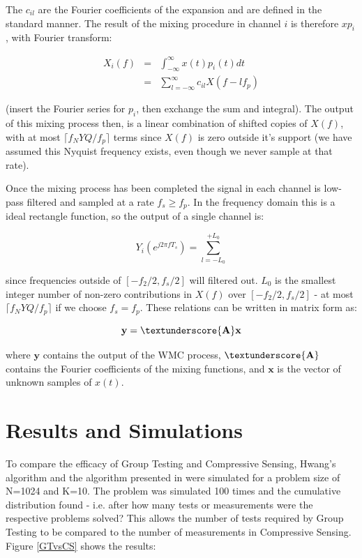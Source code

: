 \documentclass[conference]{IEEEtran}
\begin{document}
The \(c_{il}\) are the Fourier coefficients of the expansion and are defined in the standard manner. The result of the mixing procedure in channel \(i\) is therefore \(xp_i\), with Fourier transform:

\begin{align}
X_{i}\left(f\right) &=& \int_{-\infty}^{\infty} x\left(t\right) p_i\left(t\right) dt
\\ &=& \sum_{l=-\infty}^{\infty} c_{il} X\left(f-lf_p\right)
\end{align}


(insert the Fourier series for \(p_i\), then exchange the sum and integral). The output of this mixing process then, is a linear combination of shifted copies of \(X\left(f\right)\), with at most \(\lceil f_NYQ/f_p\rceil\) terms since \(X\left(f\right)\) is zero outside it's support (we have assumed this Nyquist frequency exists, even though we never sample at that rate).

Once the mixing process has been completed the signal in each channel is low-pass filtered and sampled at a rate \(f_s \geq f_p\). In the frequency domain this is a ideal rectangle function, so the output of a single channel is:

\begin{equation}
Y_i\left(e^{j 2 \pi f T_s }\right) = \sum_{l = -L_0}^{+L_0}
\end{equation}

since frequencies outside of \([-f_2/2, f_s/2]\) will filtered out. \(L_0\) is the smallest integer number of non-zero contributions in \(X\left(f\right)\) over \([-f_2/2, f_s/2]\) - at most \(\lceil f_NYQ/f_p\rceil\) if we choose \(f_s = f_p\). These relations can be written in matrix form as:

\begin{equation}
\textbf{y} = \textunderscore{\textbf{A}}\textbf{x}
\end{equation}

where \(\textbf{y}\) contains the output of the WMC process, \(\textunderscore{\textbf{A}}\) contains the Fourier coefficients of the mixing functions, and \(\textbf{x}\) is the vector of unknown samples of \(x\left(t\right)\). 


\section{Results and Simulations}
To compare the efficacy of Group Testing and Compressive Sensing, Hwang's algorithm and the algorithm presented in \cite{Aldrouobi} were simulated for a problem size of N=1024 and K=10.  The problem was simulated 100 times and the cumulative distribution found - i.e. after how many tests or measurements were the respective problems solved? This allows the number of tests required by Group Testing to be compared to the number of measurements in Compressive Sensing. Figure \ref{GTvsCS} shows the results:
\end{document}
